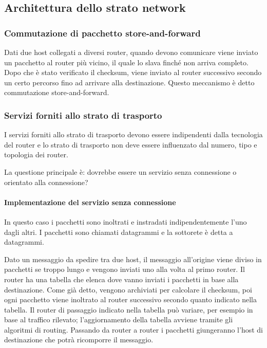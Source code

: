 \subsection{Architettura dello strato network} %

\subsubsection{Commutazione di pacchetto store-and-forward}
Dati due host collegati a diversi router, quando devono comunicare viene inviato un pacchetto al router più vicino, 
il quale lo slava finché non arriva completo.
Dopo che è stato verificato il checksum, viene inviato al router successivo secondo un certo percorso fino ad arrivare alla destinazione.
Questo meccanismo è detto commutazione store-and-forward.

\subsubsection{Servizi forniti allo strato di trasporto}
I servizi forniti allo strato di trasporto devono essere indipendenti dalla tecnologia del router e lo strato di trasporto non deve essere influenzato dal numero, tipo e topologia dei router.

La questione principale è: dovrebbe essere un servizio senza connessione o orientato alla connessione?

\paragraph{Implementazione del servizio senza connessione}
In questo caso i pacchetti sono inoltrati e instradati indipendentemente l'uno dagli altri.
I pacchetti sono chiamati datagrammi e la sottorete è detta a datagrammi.

Dato un messaggio da spedire tra due host, il messaggio all'origine viene diviso in pacchetti se troppo lungo e vengono inviati uno alla volta al primo router.
Il router ha una tabella che elenca dove vanno inviati i pacchetti in base alla destinazione.
Come già detto, vengono archiviati per calcolare il checksum, poi ogni pacchetto viene inoltrato al router successivo secondo quanto indicato nella tabella.
Il router di passaggio indicato nella tabella può variare, per esempio in base al traffico rilevato; 
l'aggiornamento della tabella avviene tramite gli algoritmi di routing.
Passando da router a router i pacchetti giungeranno l'host di destinazione che potrà ricomporre il messaggio.

